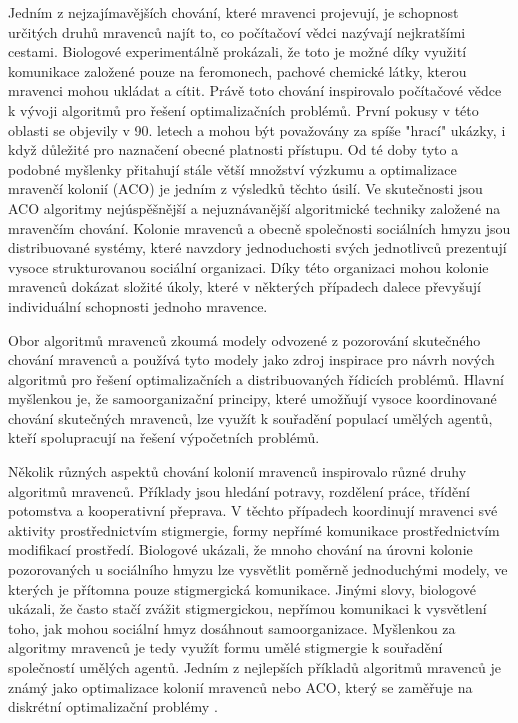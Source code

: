 Jedním z nejzajímavějších chování, které mravenci projevují, je schopnost určitých druhů mravenců najít to, co počítačoví vědci nazývají nejkratšími cestami. Biologové experimentálně prokázali, že toto je možné díky využití komunikace založené pouze na feromonech, pachové chemické látky, kterou mravenci mohou ukládat a cítit. Právě toto chování inspirovalo počítačové vědce k vývoji algoritmů pro řešení optimalizačních problémů. První pokusy v této oblasti se objevily v 90. letech a mohou být považovány za spíše "hrací" ukázky, i když důležité pro naznačení obecné platnosti přístupu. Od té doby tyto a podobné myšlenky přitahují stále větší množství výzkumu a optimalizace mravenčí kolonií (ACO) je jedním z výsledků těchto úsilí. Ve skutečnosti jsou ACO algoritmy nejúspěšnější a nejuznávanější algoritmické techniky založené na mravenčím chování. 
Kolonie mravenců a obecně společnosti sociálních hmyzu jsou distribuované systémy, které navzdory jednoduchosti svých jednotlivců prezentují vysoce strukturovanou sociální organizaci. Díky této organizaci mohou kolonie mravenců dokázat složité úkoly, které v některých případech dalece převyšují individuální schopnosti jednoho mravence.

Obor algoritmů mravenců zkoumá modely odvozené z pozorování skutečného chování mravenců a používá tyto modely jako zdroj inspirace pro návrh nových algoritmů pro řešení optimalizačních a distribuovaných řídicích problémů. Hlavní myšlenkou je, že samoorganizační principy, které umožňují vysoce koordinované chování skutečných mravenců, lze využít k souřadění populací umělých agentů, kteří spolupracují na řešení výpočetních problémů.

Několik různých aspektů chování kolonií mravenců inspirovalo různé druhy algoritmů mravenců. Příklady jsou hledání potravy, rozdělení práce, třídění potomstva a kooperativní přeprava. V těchto případech koordinují mravenci své aktivity prostřednictvím stigmergie, formy nepřímé komunikace prostřednictvím modifikací prostředí. Biologové ukázali, že mnoho chování na úrovni kolonie pozorovaných u sociálního hmyzu lze vysvětlit poměrně jednoduchými modely, ve kterých je přítomna pouze stigmergická komunikace. Jinými slovy, biologové ukázali, že často stačí zvážit stigmergickou, nepřímou komunikaci k vysvětlení toho, jak mohou sociální hmyz dosáhnout samoorganizace. Myšlenkou za algoritmy mravenců je tedy využít formu umělé stigmergie k souřadění společností umělých agentů.
Jedním z nejlepších příkladů algoritmů mravenců je známý jako optimalizace kolonií mravenců nebo ACO, který se zaměřuje na diskrétní optimalizační problémy \cite{Colony2004}.
